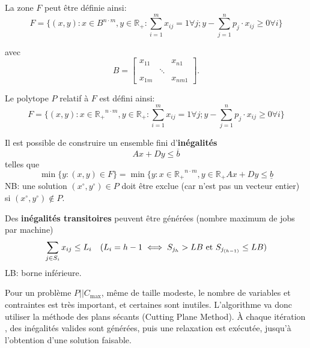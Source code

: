 \documentclass[a4paper,12pt]{report}
\theoremstyle{plain}				%
\theoremstyle{definition}				%
\newcommand\problemGrahamP{$P||C_{\max}$\xspace}
\newcommand{\lp}[1]{\todo[author=LP,color=yellow,inline]{#1}}
\begin{document}
La zone $F$ peut être définie ainsi:
\[
  F=\{ (x,y) : x \in B^{n \cdot m}, y \in \mathbb{R_+} : \sum_{i=1}^{m} x_{ij}=1 \forall j;
y-\sum_{j=1}^{n} p_j \cdot x_{ij} \geq 0 \forall i \}
\]

avec
\[
B=\begin{bmatrix}
x_{11}& &x_{n1}\\
& \ddots & \\
x_{1m}& &x_{nm1}
\end{bmatrix}.
\]

Le polytope $P$ relatif à $F$ est défini ainsi:
\[
  F=\{ (x,y) : x \in \mathbb{R_+}^{n \cdot m}, y \in \mathbb{R_+} : \sum_{i=1}^{m} x_{ij}=1 \forall j;
  y-\sum_{j=1}^{n} p_j \cdot x_{ij} \geq 0 \forall i	\}
\]
\lp{Tu n'avais pas dit P?}

Il est possible de construire un ensemble fini d'\textbf{inégalités}
\[
  Ax+Dy \leq \overline{b}
\]
telles que
\[
  \min \{y : (x,y) \in F \} = \min \{y : x \in \mathbb{R_+}^{n \cdot m}, y \in \mathbb{R_+} Ax+Dy \leq \underline{b}
\]
NB: une solution
$(x \ensuremath{^\circ} , y\ensuremath{^\circ}) \in P$ doit être
exclue (car n'est pas un vecteur entier) si
$(x\ensuremath{^\circ}, y\ensuremath{^\circ}) \notin P $.

\bigskip

Des \textbf{inégalités transitoires} peuvent être générées (nombre
maximum de jobs par machine)
\[
  \sum_{j \in S_i} x_{ij} \leq L_i \quad (L_i = h-1 \iff S_{j_h} > LB
  \textnormal{ et } S_{j_{(h-1)}} \leq LB)
\]
LB: borne inférieure.

\bigskip

Pour un problème \problemGrahamP, même de taille modeste, le nombre de
variables et contraintes est très important, et certaines sont
inutiles.
L'algorithme va donc utiliser la méthode des plans sécants (Cutting
Plane Method).
\`A chaque itération , des inégalités valides sont générées, puis une
relaxation est exécutée, jusqu'à l'obtention d'une solution faisable.
\end{document}
